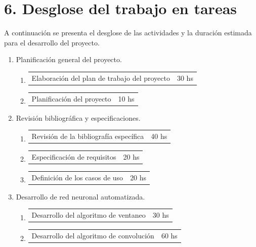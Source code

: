 \documentclass[11pt]{charter}
\begin{document}
\section*{6. Desglose del trabajo en tareas}
\label{sec:wbs}

A continuación se presenta el desglose de las actividades y la duración estimada para el desarrollo del proyecto. 

\begin{enumerate}
\item Planificación general del proyecto.
	\begin{enumerate}
	\item \begin{tabular}[]{p{11cm} p{2cm}} Elaboración del plan de trabajo del proyecto 	& 30 hs \end{tabular}
	\item \begin{tabular}[]{p{11cm} p{2cm}} Planificación del proyecto  									& 10 hs \end{tabular}
	\end{enumerate}
\item Revisión bibliográfica y especificaciones. 
	\begin{enumerate}
	\item \begin{tabular}[]{p{11cm} p{2cm}} Revisión de la bibliografía específica   			& 40 hs \end{tabular}
	\item \begin{tabular}[]{p{11cm} p{2cm}} Especificación de requisitos  								& 20 hs \end{tabular}
	\item \begin{tabular}[]{p{11cm} p{2cm}} Definición de los casos de uso 								& 20 hs \end{tabular}
	\end{enumerate}
\item Desarrollo de red neuronal automatizada.  
	\begin{enumerate}
	\item \begin{tabular}[]{p{11cm} p{2cm}} Desarrollo del algoritmo de ventaneo			 											& 30 hs \end{tabular}
	\item \begin{tabular}[]{p{11cm} p{2cm}} Desarrollo del algoritmo de convolución  												& 60 hs \end{tabular}

\end{enumerate}
\end{enumerate}
\end{document}

